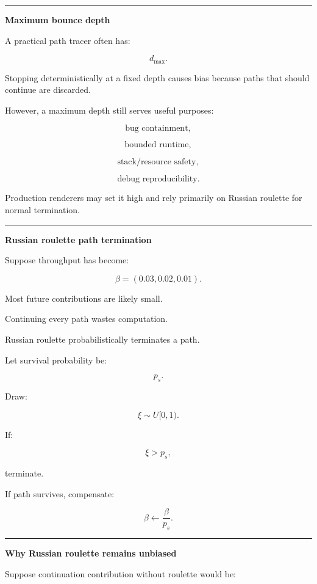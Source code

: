 \begin{center}\rule{0.5\linewidth}{0.5pt}\end{center}

\textbf{Maximum bounce depth}

A practical path tracer often has:

\[
d_{\max}.
\]

Stopping deterministically at a fixed depth causes bias because paths that should continue are discarded.

However, a maximum depth still serves useful purposes:

\[
\text{bug containment},
\]

\[
\text{bounded runtime},
\]

\[
\text{stack/resource safety},
\]

\[
\text{debug reproducibility}.
\]

Production renderers may set it high and rely primarily on Russian roulette for normal termination.

\begin{center}\rule{0.5\linewidth}{0.5pt}\end{center}

\textbf{Russian roulette path termination}

Suppose throughput has become:

\[
\beta=(0.03,0.02,0.01).
\]

Most future contributions are likely small.

Continuing every path wastes computation.

Russian roulette probabilistically terminates a path.

Let survival probability be:

\[
p_s.
\]

Draw:

\[
\xi\sim U[0,1).
\]

If:

\[
\xi>p_s,
\]

terminate.

If path survives, compensate:

\[
\boxed{
\beta
\leftarrow
\frac{\beta}{p_s}.
}
\]

\begin{center}\rule{0.5\linewidth}{0.5pt}\end{center}

\textbf{Why Russian roulette remains unbiased}

Suppose continuation contribution without roulette would be:

